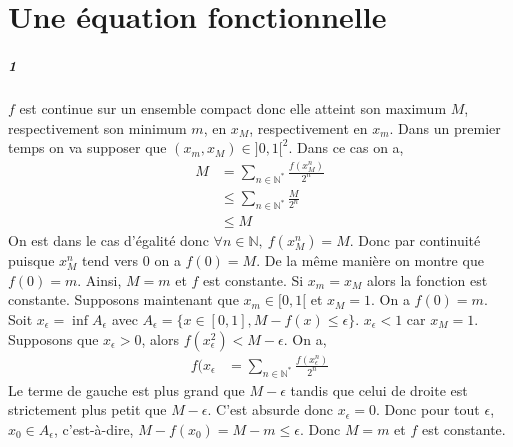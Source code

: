 \documentclass[10pt,a4paper]{article}
\begin{document}
\section{Une équation fonctionnelle}
\subparagraph{1}$f$ est continue sur un ensemble compact donc elle atteint son maximum $M$, respectivement son minimum $m$, en $x_M$, respectivement en $x_m$. Dans un premier temps on va supposer que $(x_m,x_M) \in ]0,1[^2$. Dans ce cas on a,
\begin{equation}
\begin{aligned}
M &= \underset{n \in \mathbb{N}^*}{\sum} \frac{f(x_M^n)}{2^n} \\
&\le \underset{n \in \mathbb{N}^*}{\sum} \frac{M}{2^n} \\
&\le M
\end{aligned}
\end{equation}
On est dans le cas d'égalité donc $\forall n \in \mathbb{N}, \ f(x_M^n) = M$. Donc par continuité puisque $x_M^n$ tend vers $0$ on a $f(0)=M$. De la même manière on montre que $f(0)=m$. Ainsi, $M=m$ et $f$ est constante. Si $x_m = x_M$ alors la fonction est constante. Supposons maintenant que $x_m \in [0,1[$ et $x_M = 1$. On a $f(0) = m$. Soit $x_{\epsilon} = \inf A_{\epsilon}$ avec $A_{\epsilon} = \lbrace x \in [0,1], M-f(x) \le \epsilon \rbrace$. $x_{\epsilon} <1$ car $x_M = 1$. Supposons que $x_{\epsilon} >0$, alors $f(x_{\epsilon}^2) < M-\epsilon$. On a,
\begin{equation}
\begin{aligned}
f(x_{\epsilon} &= \underset{n \in \mathbb{N}^*}{\sum} \frac{f(x_{\epsilon}^n)}{2^n}
\end{aligned}
\end{equation}
Le terme de gauche est plus grand que $M-\epsilon$ tandis que celui de droite est strictement plus petit que $M-\epsilon$. C'est absurde donc $x_{\epsilon} = 0$. Donc pour tout $\epsilon$, $x_0 \in A_{\epsilon}$, c'est-à-dire, $M -f(x_0) = M -m \le \epsilon$. Donc $M=m$ et $f$ est constante.
\end{document}
